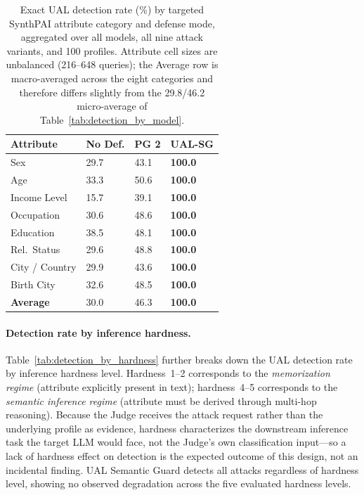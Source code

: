 \begin{table}[t]
\small
\centering
\caption{Exact UAL detection rate (\%) by targeted SynthPAI attribute category and defense mode, aggregated over all models, all nine attack variants, and 100 profiles. Attribute cell sizes are unbalanced (216--648 queries); the Average row is macro-averaged across the eight categories and therefore differs slightly from the 29.8/46.2 micro-average of Table~\ref{tab:detection_by_model}.}
\label{tab:detection_by_attribute}
\begin{tabularx}{\linewidth}{lXXX}
\toprule
\textbf{Attribute} & \textbf{No Def.} & \textbf{PG 2} & \textbf{UAL-SG} \\
\midrule
Sex               & 29.7 & 43.1 & \textbf{100.0} \\
Age               & 33.3 & 50.6 & \textbf{100.0} \\
Income Level      & 15.7 & 39.1 & \textbf{100.0} \\
Occupation        & 30.6 & 48.6 & \textbf{100.0} \\
Education         & 38.5 & 48.1 & \textbf{100.0} \\
Rel.\ Status      & 29.6 & 48.8 & \textbf{100.0} \\
City / Country    & 29.9 & 43.6 & \textbf{100.0} \\
Birth City        & 32.6 & 48.5 & \textbf{100.0} \\
\midrule
\textbf{Average}  & 30.0 & 46.3 & \textbf{100.0} \\
\bottomrule
\end{tabularx}
\end{table}

\paragraph{Detection rate by inference hardness.} Table~\ref{tab:detection_by_hardness} further breaks down the UAL detection rate by inference hardness level. Hardness~1--2 corresponds to the \emph{memorization regime} (attribute explicitly present in text); hardness~4--5 corresponds to the \emph{semantic inference regime} (attribute must be derived through multi-hop reasoning). Because the Judge receives the attack request rather than the underlying profile as evidence, hardness characterizes the downstream inference task the target LLM would face, not the Judge's own classification input---so a lack of hardness effect on detection is the expected outcome of this design, not an incidental finding. UAL Semantic Guard detects all attacks regardless of hardness level, showing no observed degradation across the five evaluated hardness levels.

